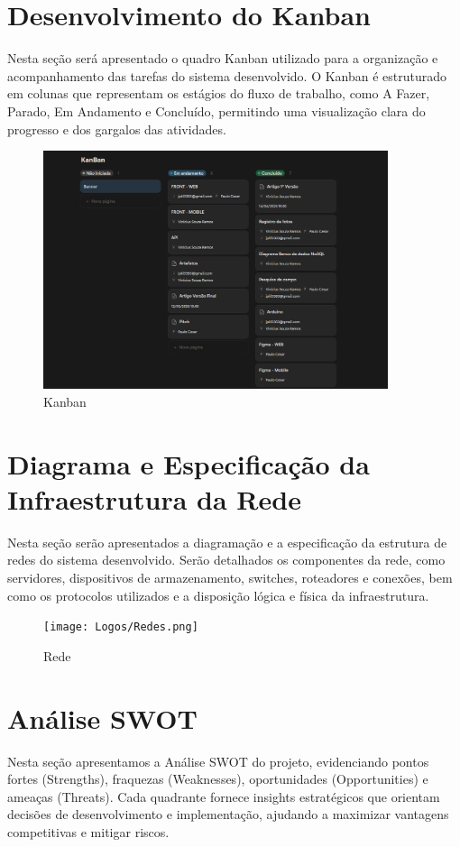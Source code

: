 \documentclass[
  a4paper,%
  12pt,%
  english,%
  brazilian,%
]{article}
\begin{document}
\section*{Desenvolvimento do Kanban}
Nesta seção será apresentado o quadro Kanban utilizado para a organização e acompanhamento das tarefas do sistema desenvolvido. O Kanban é estruturado em colunas que representam os estágios do fluxo de trabalho, como A Fazer, Parado, Em Andamento e Concluído, permitindo uma visualização clara do progresso e dos gargalos das atividades.
     \begin{figure}[h]
\centering
\caption{Kanban}%
\label{fig:kanban}
\includegraphics[width=0.9\textwidth]{Logos/Kanban.png}
\end{figure}

\newpage
\section*{Diagrama e Especificação da Infraestrutura da Rede}
Nesta seção serão apresentados a diagramação e a especificação da estrutura de redes do sistema desenvolvido. Serão detalhados os componentes da rede, como servidores, dispositivos de armazenamento, switches, roteadores e conexões, bem como os protocolos utilizados e a disposição lógica e física da infraestrutura. 
     \begin{figure}[h]
\centering
\caption{Rede}%
\label{fig:rede}
\texttt{[image: Logos/Redes.png]}
\end{figure}

\newpage
\section*{Análise SWOT}
Nesta seção apresentamos a Análise SWOT do projeto, evidenciando pontos fortes (Strengths), fraquezas (Weaknesses), oportunidades (Opportunities) e ameaças (Threats). Cada quadrante fornece insights estratégicos que orientam decisões de desenvolvimento e implementação, ajudando a maximizar vantagens competitivas e mitigar riscos.
\end{document}
